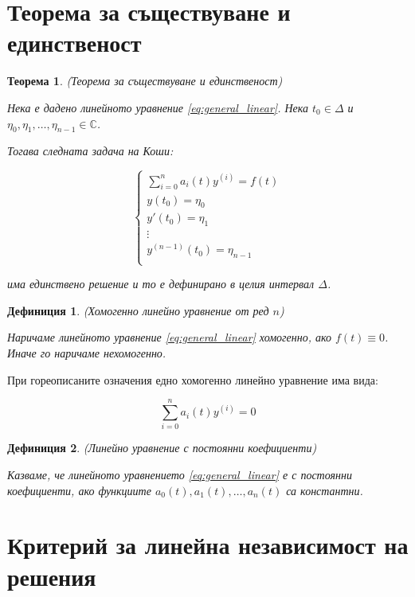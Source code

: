 \documentclass{scrartcl}
\newtheorem{theorem}{Теорема}
\newtheorem{definition}{Дефиниция}
\begin{document}
\begin{FlushLeft}
\section{Теорема за съществуване и единственост}

\begin{theorem}\label{th:unique_sol}
(Теорема за съществуване и единственост)

Нека е дадено линейното уравнение \eqref{eq:general_linear}.
Нека $t_0 \in \Delta$ и $\eta_0, \eta_1, \dots, \eta_{n-1} \in \mathbb{C}$.

Тогава следната задача на Коши:

$$
\begin{cases}
\displaystyle \sum_{i=0}^n a_i(t)y^{(i)} = f(t) \\
y(t_0) = \eta_0 \\
y'(t_0) = \eta_1 \\
\vdots \\
y^{(n-1)}(t_0) = \eta_{n-1} \\
\end{cases}
$$

има единствено решение и то е дефинирано в целия интервал $\Delta$.
\end{theorem}

\begin{definition}
(Хомогенно линейно уравнение от ред $n$)

Наричаме линейното уравнение \eqref{eq:general_linear} хомогенно, ако $f(t) \equiv 0$. Иначе го наричаме нехомогенно.
\end{definition}

При гореописаните означения едно хомогенно линейно уравнение има вида:

\begin{equation}\label{eq:homog}
    \sum_{i=0}^n a_i(t)y^{(i)} = 0
\end{equation}

\begin{definition}
(Линейно уравнение с постоянни коефициенти)

Казваме, че линейното уравнението \eqref{eq:general_linear} е с постоянни коефициенти, ако функциите $a_0(t), a_1(t), \dots, a_n(t)$ са константни.
\end{definition}

\section{Критерий за линейна независимост на решения}


\end{FlushLeft}
\end{document}
